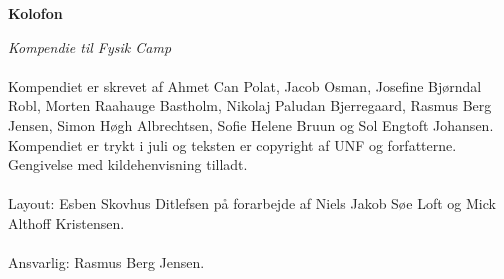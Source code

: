 \begin{center}
\textbf{Kolofon}
\end{center}
\textit{Kompendie til Fysik Camp \campyear}\\\\
Kompendiet er skrevet af Ahmet Can Polat, Jacob Osman, Josefine Bjørndal Robl, Morten Raahauge Bastholm, Nikolaj Paludan Bjerregaard, Rasmus Berg Jensen, Simon Høgh Albrechtsen, Sofie Helene Bruun og Sol Engtoft Johansen. Kompendiet er trykt i juli {\campyear} og teksten er copyright {\textcopyright} {\campyear} af UNF og forfatterne. Gengivelse med kildehenvisning tilladt. \\\\
  Layout: Esben Skovhus Ditlefsen på forarbejde af Niels Jakob Søe Loft og Mick Althoff Kristensen.\\\\
  Ansvarlig: Rasmus Berg Jensen.